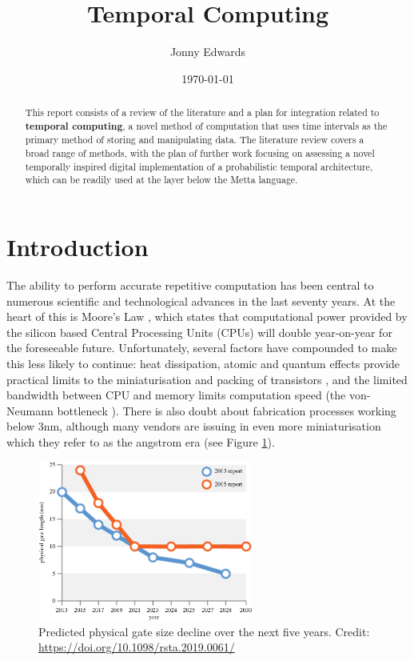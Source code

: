 \documentclass{article}
\title{Temporal Computing}
\author{Jonny Edwards}
\date{\today}
\begin{document}
\maketitle
\begin{abstract}
	This report consists of a review of the literature and a plan for integration related to \textbf{temporal computing}, a novel method of computation that uses time intervals as the primary method of storing and manipulating data. The literature review covers a broad range of methods, with the plan of further work focusing on assessing a novel temporally inspired digital implementation of a probabilistic temporal architecture, which can be readily used at the layer below the Metta language.
\end{abstract}

\section{Introduction}
The ability to perform accurate repetitive computation has been central to numerous scientific and technological advances in the last seventy years. At the heart of this is Moore's Law \cite{Moore:2000:CMC:333067.333074}, which states that computational power provided by the silicon based Central Processing Units (CPUs) will double year-on-year for the foreseeable future. Unfortunately, several factors have compounded to make this less likely to continue: heat dissipation, atomic and quantum effects provide practical limits to the miniaturisation and packing of transistors \cite{moorefail}, and the limited bandwidth between CPU and memory limits computation speed (the von-Neumann bottleneck \cite{Backus:1978:PLV:359576.359579}). There is also doubt about  fabrication processes working below 3nm, although many vendors are issuing in even more miniaturisation which they refer to as the angstrom era (see Figure \ref{fig:intel}).


\begin{figure}[ht]
	\centering
	\includegraphics[width=200pt]{figures/intel2.jpg}
	\caption{Predicted physical gate size decline over the next five years. Credit: \url{https://doi.org/10.1098/rsta.2019.0061/}}
	\label{fig:intel}
\end{figure}
\end{document}
